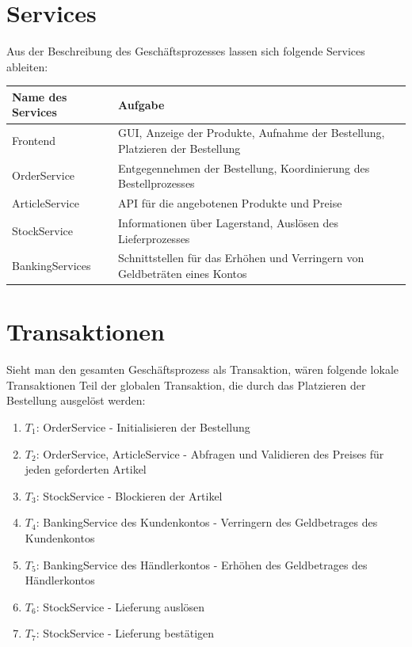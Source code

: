 \section{Services}
Aus der Beschreibung des Geschäftsprozesses lassen sich folgende Services ableiten:

\begin{center}
	\begin{tabular}[h]{|p{3.5cm}|p{12cm}|}
		\hline
		Name des Services & Aufgabe \\ \hline
		Frontend & GUI, Anzeige der Produkte, Aufnahme der Bestellung, Platzieren der Bestellung \\ \hline
		OrderService & Entgegennehmen der Bestellung, Koordinierung des Bestellprozesses \\ \hline
		ArticleService & API für die angebotenen Produkte und Preise \\ \hline
		StockService & Informationen über Lagerstand, Auslösen des Lieferprozesses \\ \hline
		BankingServices & Schnittstellen für das Erhöhen und Verringern von Geldbeträten eines Kontos \\ \hline
	\end{tabular}
\end{center}

\section{Transaktionen}
Sieht man den gesamten Geschäftsprozess als Transaktion, wären folgende lokale Transaktionen Teil der globalen Transaktion, die durch das Platzieren der Bestellung ausgelöst werden:
\begin{enumerate}
	\item $T_1$: OrderService - Initialisieren der Bestellung
	\item $T_2$: OrderService, ArticleService - Abfragen und Validieren des Preises für jeden geforderten Artikel 
	\item $T_3$: StockService - Blockieren der Artikel
	\item $T_4$: BankingService des Kundenkontos - Verringern des Geldbetrages des Kundenkontos
	\item $T_5$: BankingService des Händlerkontos - Erhöhen des Geldbetrages des Händlerkontos
	\item $T_6$: StockService - Lieferung auslösen
	\item $T_7$: StockService - Lieferung bestätigen
\end{enumerate}

